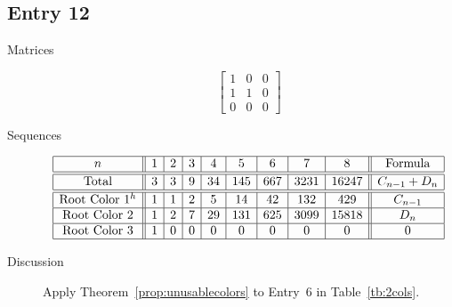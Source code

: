 \documentclass[12pt]{amsart}
\begin{document}
\subsection*{Entry 12}
\begin{description}
    \item[Matrices]
    
    \[\begin{bmatrix}
1 & 0 & 0 \\
1 & 1 & 0 \\
0 & 0 & 0
\end{bmatrix}\]
    \item[Sequences]\hspace*{\fill}\vspace{-0.5cm}
    \begin{center}
        \[
        \begin{array}{|c||c|c|c|c|c|c|c|c||c|}\hline
           n  & 1 & 2 & 3 & 4 & 5 & 6 & 7 & 8  & \text{Formula}\\\hline\hline
           \text{Total}  & 3 & 3 & 9 & 34 & 145 & 667 & 3231 & 16247 & C_{n-1} + D_{n}\\\hline\hline
           \text{Root Color }1^{h} & 1 & 1 & 2 & 5 & 14 & 42 & 132 & 429 & C_{n-1}\\\hline
           \text{Root Color }2 & 1 & 2 & 7 & 29 & 131 & 625 & 3099 & 15818 & D_n\\\hline
           \text{Root Color }3 & 1 & 0 & 0 & 0 & 0 & 0 & 0 & 0 & 0\\\hline
        \end{array}
        \]
    \end{center}
    

    \item[Discussion] 
    Apply Theorem~\ref{prop:unusablecolors} to Entry~6 in Table~\ref{tb:2cols}.
\end{description}
\end{document}
